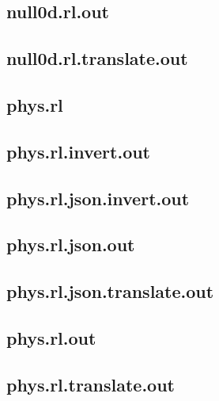 \subsection{null0d.rl.out}
\label{app:null0d_rl.out}

\subsection{null0d.rl.translate.out}
\label{app:null0d_rl.translate.out}

\subsection{phys.rl}
\label{app:phys_rl}

\subsection{phys.rl.invert.out}
\label{app:phys_rl.invert.out}

\subsection{phys.rl.json.invert.out}
\label{app:phys_rl.json.invert.out}

\subsection{phys.rl.json.out}
\label{app:phys_rl.json.out}

\subsection{phys.rl.json.translate.out}
\label{app:phys_rl.json.translate.out}

\subsection{phys.rl.out}
\label{app:phys_rl.out}

\subsection{phys.rl.translate.out}
\label{app:phys_rl.translate.out}

